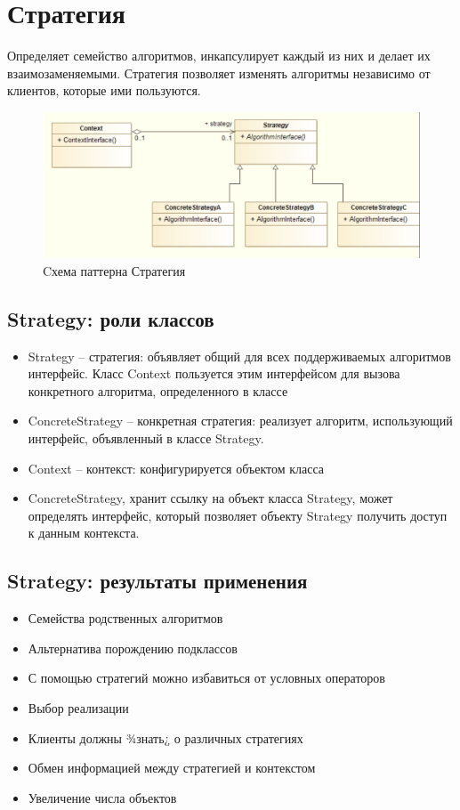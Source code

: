 \section{Стратегия}
Определяет семейство алгоритмов, инкапсулирует каждый из них и делает их
взаимозаменяемыми. Стратегия позволяет изменять алгоритмы независимо
от клиентов, которые ими пользуются.
\begin{figure}[!ht]
\begin{center}
\includegraphics[scale=0.7]{images/pic/pic28-1.png}\caption{Cхема паттерна Стратегия}\label{figure1}
\end{center}
\end{figure}
\subsection{Strategy: роли классов}
\begin{itemize}
    \item Strategy – стратегия: объявляет общий для всех поддерживаемых алгоритмов интерфейс. Класс Context пользуется этим интерфейсом для вызова конкретного алгоритма, определенного в классе
    \item ConcreteStrategy – конкретная стратегия: реализует алгоритм, использующий интерфейс, объявленный в классе Strategy.
    \item Context – контекст: конфигурируется объектом класса
    \item ConcreteStrategy, хранит ссылку на объект класса Strategy, может определять интерфейс, который позволяет объекту Strategy получить доступ к данным контекста.
\end{itemize}
\subsection{Strategy: результаты применения}
\begin{itemize}
    \item Семейства родственных алгоритмов
    \item Альтернатива порождению подклассов
    \item С помощью стратегий можно избавиться от условных операторов
    \item Выбор реализации
    \item Клиенты должны ¾знать¿ о различных стратегиях
    \item Обмен информацией между стратегией и контекстом
    \item Увеличение числа объектов
\end{itemize}
